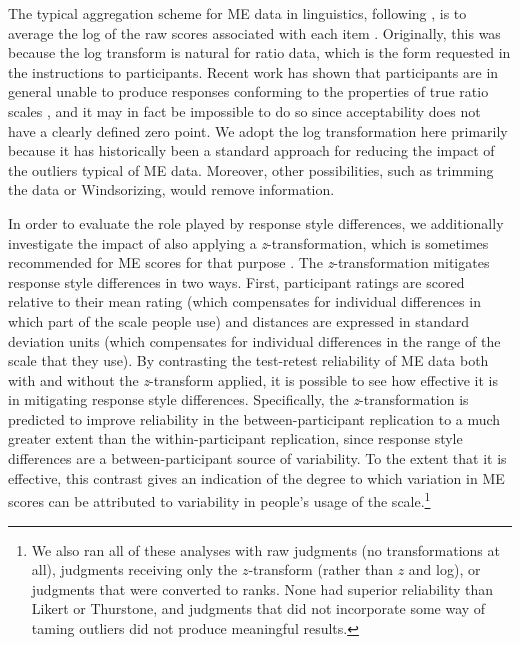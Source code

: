 \documentclass[doc]{apa6}
\newcommand{\ME}{{\sc ME}}%
\newcommand{\thurstone}{{\sc Thurstone}}
\newcommand{\likert}{{\sc Likert}}
\begin{document}
The typical aggregation scheme for \ME{} data in linguistics, following \citet{bard1996magnitudeestimation}, is to average the log of the raw scores associated with each item \citep{sorace2010magestindevling,weskott2011informativity}.
Originally, this was because the log transform is natural for ratio data, which is the form requested in the instructions to participants. Recent work has shown that participants are in general unable to produce responses conforming to the properties of true ratio scales \citep{sprouse2011commutativity}, and it may in fact be impossible to do so since acceptability does not have a clearly defined zero point. We adopt the log transformation here primarily because it has historically been a standard approach for reducing the impact of the outliers typical of \ME{} data. Moreover, other possibilities, such as trimming the data or Windsorizing, would remove information.

In order to evaluate the role played by response style differences, we additionally investigate the impact of also applying a {\it z}-transformation, which is sometimes recommended for \ME{} scores for that purpose \citep{fukuda2012ismagestworththetrouble,sprouse2011poweracceptabilityjudgment,featherston2005MEwhatitcando}.
The {\it z}-transformation mitigates response style differences in two ways.
First, participant ratings are scored relative to their mean rating (which compensates for individual differences in which part of the scale people use) and distances are expressed in standard deviation units (which compensates for individual differences in the range of the scale that they use).
By contrasting the test-retest reliability of \ME{} data both with and without the \textit{z}-transform applied, it is possible to see how effective it is in mitigating response style differences. Specifically, the \textit{z}-transformation is predicted to improve reliability in the between-participant replication to a much greater extent than the within-participant replication, since response style differences are a between-participant source of variability. To the extent that it is effective, this contrast gives an indication of the degree to which variation in \ME{} scores can be attributed to variability in people's usage of the scale.\footnote{We also ran all of these analyses with raw judgments (no transformations at all), judgments receiving only the $z$-transform (rather than $z$ and log), or judgments that were converted to ranks. None had superior reliability than \likert{} or \thurstone{}, and judgments that did not incorporate some way of taming outliers did not produce meaningful results.}
\end{document}
